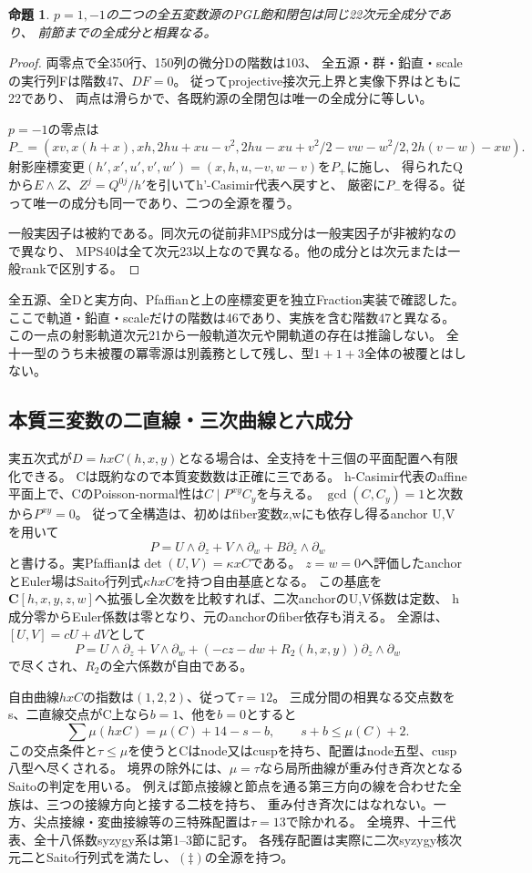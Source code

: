 \documentclass[a4paper,11pt]{ltjsarticle}
\newtheorem{proposition}{命題}[section]
\theoremstyle{definition}
\newcommand{\CC}{\mathbf C}
\begin{document}
\begin{proposition}\label{prop:two-h-cubic22}
$p=1,-1$の二つの全五変数源のPGL飽和閉包は同じ22次元全成分であり、
前節までの全成分と相異なる。
\end{proposition}
\begin{proof}
両零点で全350行、150列の微分Dの階数は103、
全五源・群・鉛直・scaleの実行列Fは階数47、$DF=0$。
従ってprojective接次元上界と実像下界はともに22であり、
両点は滑らかで、各既約源の全閉包は唯一の全成分に等しい。

$p=-1$の零点は
\[
 P_-=(xv,x(h+x),xh,2hu+xu-v^2,
       2hu-xu+v^2/2-vw-w^2/2,2h(v-w)-xw).
\]
射影座標変更$(h',x',u',v',w')=(x,h,u,-v,w-v)$を$P_+$に施し、
得られたQから$E\wedge Z$、$Z^j=Q^{0j}/h'$を引いてh'-Casimir代表へ戻すと、
厳密に$P_-$を得る。従って唯一の成分も同一であり、二つの全源を覆う。

一般実因子は被約である。同次元の従前非MPS成分は一般実因子が非被約なので異なり、
MPS40は全て次元23以上なので異なる。他の成分とは次元または一般rankで区別する。
\end{proof}
全五源、全Dと実方向、Pfaffianと上の座標変更を独立Fraction実装で確認した。
ここで軌道・鉛直・scaleだけの階数は46であり、実族を含む階数47と異なる。
この一点の射影軌道次元21から一般軌道次元や開軌道の存在は推論しない。
全十一型のうち未被覆の冪零源は別義務として残し、型$1+1+3$全体の被覆とはしない。

\subsection{本質三変数の二直線・三次曲線と六成分}
実五次式が$D=hxC(h,x,y)$となる場合は、全支持を十三個の平面配置へ有限化できる。
Cは既約なので本質変数数は正確に三である。
h-Casimir代表のaffine平面上で、CのPoisson-normal性は$C\mid P^{xy}C_y$を与える。
$\gcd(C,C_y)=1$と次数から$P^{xy}=0$。
従って全構造は、初めはfiber変数z,wにも依存し得るanchor U,Vを用いて
\[
 P=U\wedge\partial_z+V\wedge\partial_w+B\partial_z\wedge\partial_w
\]
と書ける。実Pfaffianは$\det(U,V)=\kappa xC$である。
$z=w=0$へ評価したanchorとEuler場はSaito行列式$\kappa hxC$を持つ自由基底となる。
この基底を$\CC[h,x,y,z,w]$へ拡張し全次数を比較すれば、二次anchorのU,V係数は定数、
h成分零からEuler係数は零となり、元のanchorのfiber依存も消える。
全源は、$[U,V]=cU+dV$として
\[
 P=U\wedge\partial_z+V\wedge\partial_w+
 (-cz-dw+R_2(h,x,y))\partial_z\wedge\partial_w                 \tag{\ddagger}
\]
で尽くされ、$R_2$の全六係数が自由である。

自由曲線$hxC$の指数は$(1,2,2)$、従って$\tau=12$。
三成分間の相異なる交点数をs、二直線交点がC上なら$b=1$、他を$b=0$とすると
\[
 \sum\mu(hxC)=\mu(C)+14-s-b,
 \qquad s+b\le\mu(C)+2.
\]
この交点条件と$\tau\le\mu$を使うとCはnode又はcuspを持ち、配置はnode五型、cusp八型へ尽くされる。
境界の除外には、$\mu=\tau$なら局所曲線が重み付き斉次となるSaitoの判定を用いる。
例えば節点接線と節点を通る第三方向の線を合わせた全族は、三つの接線方向と接する二枝を持ち、
重み付き斉次にはなれない。一方、尖点接線・変曲接線等の三特殊配置は$\tau=13$で除かれる。
全境界、十三代表、全十八係数syzygy系は第1--3節に記す。
各残存配置は実際に二次syzygy核次元二とSaito行列式を満たし、$(\ddagger)$の全源を持つ。
\end{document}
